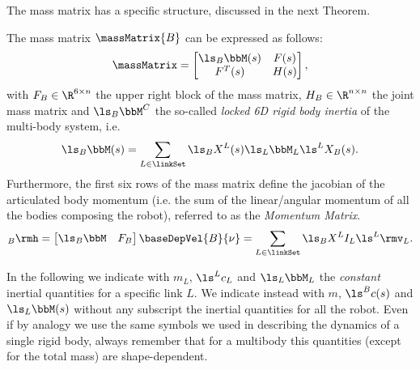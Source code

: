 
The mass matrix has a specific structure, discussed in the next Theorem.

\begin{theorem}
\label{thm:massMatrixStructure}
The mass matrix $\massMatrix{B}$ can be expressed as follows:
\begin{equation}
\label{eq:massMatrixStructure}
\massMatrix
= 
\begin{bmatrix}
\ls_{B} \bbM(s) & F(s) \\
F^{T}(s) & H(s)
\end{bmatrix},
\end{equation}
with $F_B \in \R^{6 \times n}$ the upper right block of the mass matrix, $H_B \in \R^{n \times n}$ the joint mass matrix and
$\ls_{{B}} \bbM^C$ the so-called \emph{locked 6D rigid body inertia}  of the multi-body system, i.e. 
\begin{equation}
\ls_{{B}} \bbM(s) = \sum_{L \in \linkSet} \ls_{{B}} X^L(s) \ls_L \bbM_L \ls^L X_{{B}}(s).
 \end{equation}
Furthermore, 
the first six rows of the mass matrix define the jacobian of the articulated body momentum (i.e. the sum of the linear/angular momentum of all the bodies composing the robot), referred to as the \emph{Momentum Matrix}. 
\begin{equation}
\label{eq:momentumMatrix}
{}_{{B}} \rmh =
\begin{bmatrix}
\ls_{{B}} \bbM & F_B
\end{bmatrix} \baseDepVel{B}{\nu} = 
 \sum_{L \in \linkSet} \ls_{{B}} X^L I_L \ls^L \rmv_L.
\end{equation}
\end{theorem}

\begin{remark}
In the following we indicate with $m_L$, $\ls^L c_L$ and $\ls_L \bbM_L$ the \emph{constant} inertial quantities for a specific link $L$. We indicate instead with $m$, $\ls^B c(s)$ and $\ls_L \bbM(s)$ without any subscript the inertial quantities for all the robot. Even if by analogy we use the same symbols we used in describing the dynamics of a single rigid body, always remember that for a multibody this quantities (except for the total mass) are shape-dependent.   
\end{remark}


